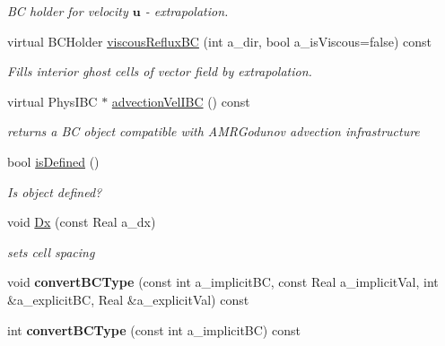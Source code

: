 \begin{DoxyCompactItemize}
\begin{DoxyCompactList}\small\item\em B\-C holder for velocity $ \mathbf{u} $ -\/ extrapolation. \end{DoxyCompactList}\item 
virtual B\-C\-Holder \hyperlink{class_phys_b_c_util_aac70ea0fdeca92be7adaef6317a52fe0}{viscous\-Reflux\-B\-C} (int a\-\_\-dir, bool a\-\_\-is\-Viscous=false) const 
\begin{DoxyCompactList}\small\item\em Fills interior ghost cells of vector field by extrapolation. \end{DoxyCompactList}\item 
virtual Phys\-I\-B\-C $\ast$ \hyperlink{class_phys_b_c_util_af5990ab84f0758727c35c27b4a02f35b}{advection\-Vel\-I\-B\-C} () const 
\begin{DoxyCompactList}\small\item\em returns a B\-C object compatible with A\-M\-R\-Godunov advection infrastructure \end{DoxyCompactList}\item 
\hypertarget{class_phys_b_c_util_afbc82bf7d509c99722005bbb202bd71e}{bool \hyperlink{class_phys_b_c_util_afbc82bf7d509c99722005bbb202bd71e}{is\-Defined} ()}\label{class_phys_b_c_util_afbc82bf7d509c99722005bbb202bd71e}

\begin{DoxyCompactList}\small\item\em Is object defined? \end{DoxyCompactList}\item 
\hypertarget{class_phys_b_c_util_a35dc4c0a9f1f3a7515c924d2de3dcaf7}{void \hyperlink{class_phys_b_c_util_a35dc4c0a9f1f3a7515c924d2de3dcaf7}{Dx} (const Real a\-\_\-dx)}\label{class_phys_b_c_util_a35dc4c0a9f1f3a7515c924d2de3dcaf7}

\begin{DoxyCompactList}\small\item\em sets cell spacing \end{DoxyCompactList}\item 
\hypertarget{class_phys_b_c_util_a58e8554dff0205baa224603fe7dfdc0a}{void {\bfseries convert\-B\-C\-Type} (const int a\-\_\-implicit\-B\-C, const Real a\-\_\-implicit\-Val, int \&a\-\_\-explicit\-B\-C, Real \&a\-\_\-explicit\-Val) const }\label{class_phys_b_c_util_a58e8554dff0205baa224603fe7dfdc0a}

\item 
\hypertarget{class_phys_b_c_util_acda802116f691baba67995132d60752b}{int {\bfseries convert\-B\-C\-Type} (const int a\-\_\-implicit\-B\-C) const }\label{class_phys_b_c_util_acda802116f691baba67995132d60752b}


\end{DoxyCompactItemize}
